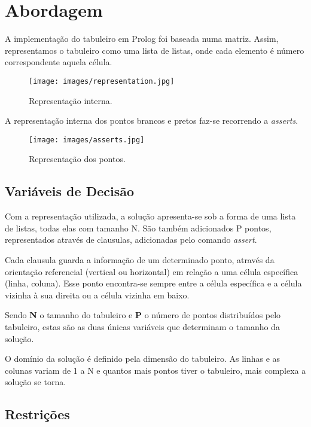 \documentclass[runningheads,a4paper]{llncs}
\begin{document}
\section{Abordagem}

A implementação do tabuleiro em Prolog foi baseada numa matriz. Assim, representamos o tabuleiro como uma lista de listas, onde cada elemento é número correspondente aquela célula.

\begin{figure}[H]
	\centering
	\texttt{[image: images/representation.jpg]}
	\caption{Representação interna.}
	\label{fig:representation}
\end{figure}

A representação interna dos pontos brancos e pretos faz-se recorrendo a \textit{asserts}.  

\begin{figure}[H]
	\centering
	\texttt{[image: images/asserts.jpg]}
	\caption{Representação dos pontos.}
	\label{fig:dotRepresentation}
\end{figure}

\subsection{Variáveis de Decisão}

Com a representação utilizada, a solução apresenta-se sob a forma de uma lista de listas, todas elas com tamanho N. São também adicionados P pontos, representados através de clausulas, adicionadas pelo comando \textit{assert}.

Cada clausula guarda a informação de um determinado ponto, através da orientação referencial (vertical ou horizontal) em relação a uma célula específica (linha, coluna). Esse ponto encontra-se sempre entre a célula específica e a célula vizinha à sua direita ou a célula vizinha em baixo.

Sendo \textbf{N} o tamanho do tabuleiro e \textbf{P} o número de pontos distribuídos pelo tabuleiro, estas são as duas únicas variáveis que determinam o tamanho da solução.   

O domínio da solução é definido pela dimensão do tabuleiro. As linhas e as colunas variam de 1 a N e quantos mais pontos tiver o tabuleiro, mais complexa a solução se torna.

\subsection{Restrições}
\end{document}
